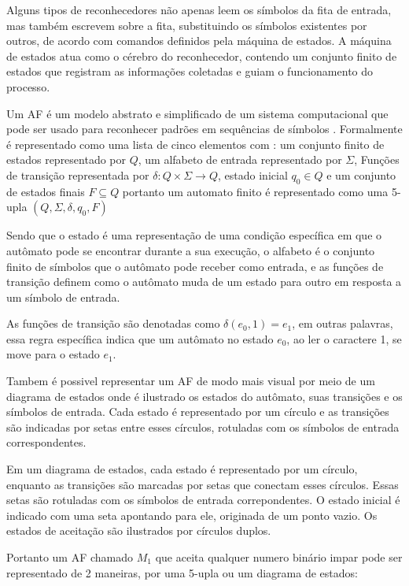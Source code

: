 Alguns tipos de reconhecedores não apenas leem os símbolos da fita de entrada, mas também escrevem sobre a fita, substituindo os símbolos existentes por outros, de acordo com comandos definidos pela máquina de estados. A máquina de estados atua como o cérebro do reconhecedor, contendo um conjunto finito de estados que registram as informações coletadas e guiam o funcionamento do processo\cite{reconhecimento}.


Um \ac{AF} é um modelo abstrato e simplificado de um sistema computacional que pode ser usado para reconhecer padrões em sequências de símbolos \cite{afd}. Formalmente é representado como uma lista de cinco elementos  com : 
um conjunto finito de estados representado por $Q$, um alfabeto de entrada representado por $\Sigma$, Funções de transição representada por $\delta : Q \times \Sigma \rightarrow Q$, estado inicial $q_0 \in Q$ e um conjunto de estados finais $F \subseteq Q$ portanto um automato finito é representado como uma 5-upla $(Q, \Sigma, \delta, q_0, F)$

Sendo que o estado é uma representação de uma condição específica em que o autômato pode se encontrar durante a sua execução, o alfabeto é o conjunto finito de símbolos que o autômato pode receber como entrada, e as funções de transição definem como o autômato muda de um estado para outro em resposta a um símbolo de entrada.

As funções de transição são denotadas como $\delta(e_0, 1) = e_1$, em outras palavras, essa regra específica indica que um autômato no estado $e_0$, ao ler o caractere 1, se move para o estado $e_1$.

Tambem é possivel representar um \ac{AF} de modo mais visual por meio de um diagrama de estados onde é ilustrado os estados do autômato, suas transições e os símbolos de entrada. Cada estado é representado por um círculo e as transições são indicadas por setas entre esses círculos, rotuladas com os símbolos de entrada correspondentes.\cite{afd}

Em um diagrama de estados, cada estado é representado por um círculo, enquanto as transições são marcadas por setas que conectam esses círculos. Essas setas são rotuladas com os símbolos de entrada correpondentes. O estado inicial é indicado com uma seta apontando para ele, originada de um ponto vazio. Os estados de aceitação são ilustrados por círculos duplos.

Portanto um \ac{AF} chamado $M_1$ que aceita qualquer numero binário impar pode ser representado de 2 maneiras,  por uma 5-upla ou um diagrama de estados:

